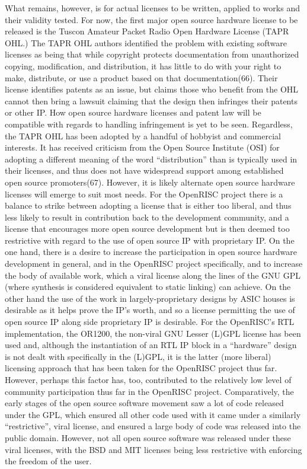\documentclass[a4paper,11pt]{article}
\begin{document}
What remains, however, is for actual licenses to be written, applied to works
and their validity tested. For now, the first major open source hardware license to
be released is the Tuscon Amateur Packet Radio Open Hardware License (TAPR
OHL.) The TAPR OHL authors identified the problem with existing software licenses
as being that while copyright protects documentation from unauthorized
copying, modification, and distribution, it has little to do with your right to make,
distribute, or use a product based on that documentation(66). Their license identifies
patents as an issue, but claims those who benefit from the OHL cannot then
bring a lawsuit claiming that the design then infringes their patents or other IP.
How open source hardware licenses and patent law will be compatible with regards
to handling infringement is yet to be seen. Regardless, the TAPR OHL has been
adopted by a handful of hobbyist and commercial interests. It has received criticism
from the Open Source Institute (OSI) for adopting a different meaning of the
word “distribution” than is typically used in their licenses, and thus does not have
widespread support among established open source promoters(67). However, it is
likely alternate open source hardware licenses will emerge to suit most needs.
For the OpenRISC project there is a balance to strike between adopting a license
that is either too liberal, and thus less likely to result in contribution back to
the development community, and a license that encourages more open source development
but is then deemed too restrictive with regard to the use of open source
IP with proprietary IP. On the one hand, there is a desire to increase the participation
in open source hardware development in general, and in the OpenRISC
project specifically, and to increase the body of available work, which a viral license
along the lines of the GNU GPL (where synthesis is considered equivalent to static
linking) can achieve. On the other hand the use of the work in largely-proprietary
designs by ASIC houses is desirable as it helps prove the IP’s worth, and so a license
permitting the use of open source IP along side proprietary IP is desirable.
For the OpenRISC’s RTL implementation, the OR1200, the non-viral GNU Lesser
(L)GPL license has been used and, although the instantiation of an RTL IP block
in a “hardware” design is not dealt with specifically in the (L)GPL, it is the latter
(more liberal) licensing approach that has been taken for the OpenRISC project
thus far.
However, perhaps this factor has, too, contributed to the relatively low level
of community participation thus far in the OpenRISC project. Comparatively,
the early stages of the open source software movement saw a lot of code released
under the GPL, which ensured all other code used with it came under a similarly
“restrictive”, viral license, and ensured a large body of code was released into the
public domain. However, not all open source software was released under these viral
licenses, with the BSD and MIT licenses being less restrictive with enforcing the
freedom of the user.
\end{document}
